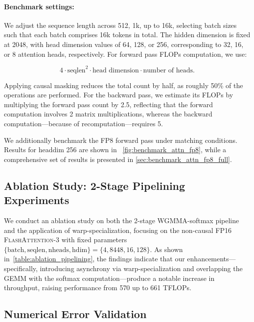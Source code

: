 \paragraph{Benchmark settings:} We adjust the sequence length across 512, 1k, up to 16k, selecting batch sizes such that each batch comprises 16k tokens in total. The hidden dimension is fixed at 2048, with head dimension values of 64, 128, or 256, corresponding to 32, 16, or 8 attention heads, respectively. For forward pass FLOPs computation, we use:

\begin{equation*}
  4 \cdot \text{seqlen}^2 \cdot \text{head dimension} \cdot \text{number of heads}.
\end{equation*}

Applying causal masking reduces the total count by half, as roughly 50\% of the operations are performed. For the backward pass, we estimate its FLOPs by multiplying the forward pass count by 2.5, reflecting that the forward computation involves 2 matrix multiplications, whereas the backward computation—because of recomputation—requires 5.

We additionally benchmark the FP8 forward pass under matching conditions. Results for headdim 256 are shown in ~\cref{fig:benchmark_attn_fp8}, while a comprehensive set of results is presented in \cref{sec:benchmark_attn_fp8_full}.

\subsection{Ablation Study: 2-Stage Pipelining Experiments}
\label{sec:2-stage-pipelining-experiments}

We conduct an ablation study on both the 2-stage WGMMA-softmax pipeline and the application of warp-specialization, focusing on the non-causal FP16 \textsc{FlashAttention-3} with fixed parameters $\{\text{batch}, \text{seqlen}, \text{nheads}, \text{hdim}\} = \{4, 8448, 16, 128\}$. As shown in~\cref{table:ablation_pipelining}, the findings indicate that our enhancements—specifically, introducing asynchrony via warp-specialization and overlapping the GEMM with the softmax computation—produce a notable increase in throughput, raising performance from 570 up to 661 TFLOPs.

\subsection{Numerical Error Validation}
\label{sec:numerical_error}

